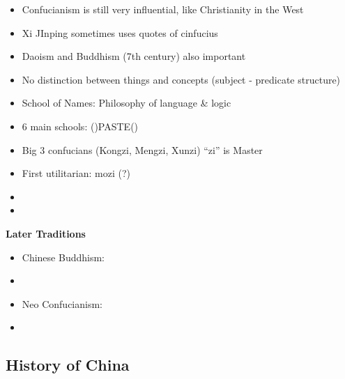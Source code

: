\documentclass[emulatestandardclasses]{scrartcl}
\begin{document}
\begin{itemize}
  \item Confucianism is still very influential, like Christianity in the West
  \item Xi JInping sometimes uses quotes of cinfucius
  \item Daoism and Buddhism (7th century) also important
  \item No distinction between things and concepts (subject - predicate structure)
  \item School of Names: Philosophy of language \& logic
  \item 6 main schools: ()PASTE()
  \item Big 3 confucians (Kongzi, Mengzi, Xunzi) "`zi"' is Master
  \item First utilitarian: mozi (?)
  \item 
  \item 
\end{itemize}

\textbf{Later Traditions}

\begin{itemize}
  \item Chinese Buddhism:
  \item 
  \item Neo Confucianism:
  \item 
\end{itemize}

\subsection{History of China}
\end{document}
